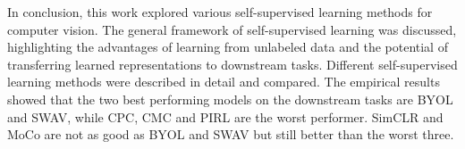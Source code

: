 In conclusion, this work explored various self-supervised learning methods for computer vision. The general framework of self-supervised learning was discussed, highlighting the advantages of learning from unlabeled data and the potential of transferring learned representations to downstream tasks. Different self-supervised learning methods were described in detail and compared. The empirical results showed that the two best performing models on the downstream tasks are BYOL and SWAV, while CPC, CMC and PIRL are the worst performer. SimCLR and MoCo are not as good as BYOL and SWAV but still better than the worst three.